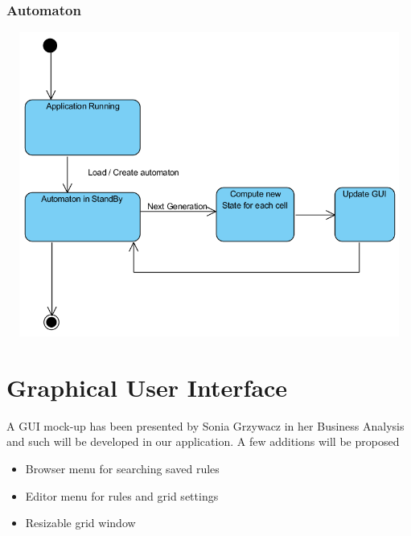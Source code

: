 \documentclass{article}
\begin{document}
	\subsubsection{Automaton}
		\hspace{-90pt}
		\includegraphics[width=150mm, height=100mm]{images/state_automaton_d.png} \\	

\section{Graphical User Interface}
A GUI mock-up has been presented by Sonia Grzywacz in her Business Analysis and such
will be developed in our application. A few additions will be proposed

\begin{itemize}
	\item Browser menu for searching saved rules
	\item Editor menu for rules and grid settings
	\item Resizable grid window
\end{itemize}

	
\end{document}
